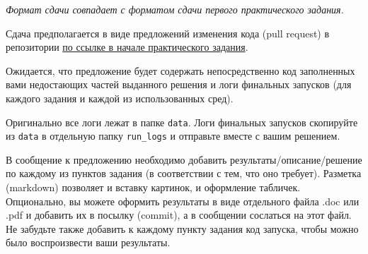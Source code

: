 \documentclass[12pt, oneside]{article}
\begin{document}
\textit{Формат сдачи совпадает с форматом сдачи первого практического задания.}

Сдача предполагается в виде предложений изменения кода (pull request) в репозитории \href{https://github.com/pkuderov/mipt-rl-hw-2022}{по ссылке в начале практического задания}.

Ожидается, что предложение будет содержать непосредственно код заполненных вами недостающих частей выданного решения и логи финальных запусков (для каждого задания и каждой из использованных сред). 

Оригинально все логи лежат в папке \verb|data|. Логи финальных запусков скопируйте из \verb|data| в отдельную папку \verb|run_logs| и отправьте вместе с вашим решением.

В сообщение к предложению необходимо добавить результаты/описание/решение по каждому из пунктов задания (в соответствии с тем, что оно требует). Разметка (markdown) позволяет и вставку картинок, и оформление табличек. Опционально, вы можете оформить результаты в виде отдельного файла .doc или .pdf и добавить их в посылку (commit), а в сообщении сослаться на этот файл. Не забудьте также добавить к каждому пункту задания код запуска, чтобы можно было воспроизвести ваши результаты.
\end{document}
